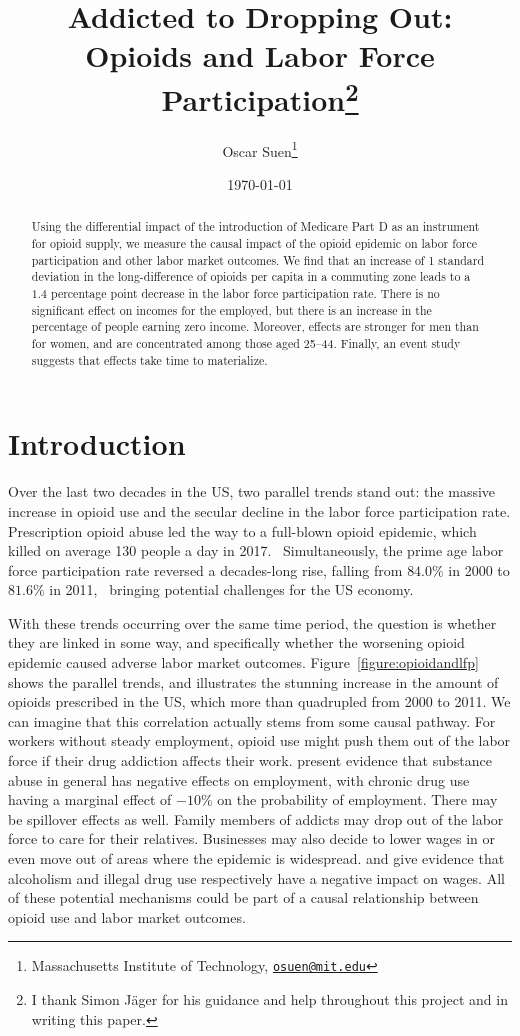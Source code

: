 \documentclass[12pt]{article}
\title{Addicted to Dropping Out: \\ Opioids and Labor Force Participation\thanks{I thank Simon J\"ager for his guidance and help throughout this project and in writing this paper.}}
\author{Oscar Suen\thanks{Massachusetts Institute of Technology, \href{mailto:osuen@mit.edu}{\texttt{osuen@mit.edu}}}}
\date{\today}
\begin{document}
\maketitle

\begin{abstract}
\noindent Using the differential impact of the introduction of Medicare Part D as an instrument for opioid supply, we measure the causal impact of the opioid epidemic on labor force participation and other labor market outcomes.  We find that an increase of 1 standard deviation in the long-difference of opioids per capita in a commuting zone leads to a $1.4$ percentage point decrease in the labor force participation rate.  
There is no significant effect on incomes for the employed, but there is an increase in the percentage of people earning zero income.  Moreover, effects are stronger for men than for women, and are concentrated among those aged 25--44.  Finally, an event study suggests that effects take time to materialize.
\end{abstract}

\newpage
\section{Introduction} \label{introduction}
Over the last two decades in the US, two parallel trends stand out: the massive increase in opioid use and the secular decline in the labor force participation rate.  Prescription opioid abuse led the way to a full-blown opioid epidemic, which killed on average 130 people a day in 2017.~ Simultaneously, the prime age labor force participation rate reversed a decades-long rise, falling from $84.0\%$ in 2000 to $81.6\%$ in 2011,~ bringing potential challenges for the US economy.

With these trends occurring over the same time period, the question is whether they are linked in some way, and specifically whether the worsening opioid epidemic caused adverse labor market outcomes.  Figure~\ref{figure:opioidandlfp} shows the parallel trends, and illustrates the stunning increase in the amount of opioids prescribed in the US, which more than quadrupled from 2000 to 2011.  We can imagine that this correlation actually stems from some causal pathway.  For workers without steady employment, opioid use might push them out of the labor force if their drug addiction affects their work.  \textcite{miamidrugs} present evidence that substance abuse in general has negative effects on employment, with chronic drug use having a marginal effect of $-10\%$ on the probability of employment.  There may be spillover effects as well.  Family members of addicts may drop out of the labor force to care for their relatives.  Businesses may also decide to lower wages in or even move out of areas where the epidemic is widespread.  \textcite{mullahy93} and \textcite{kaestner94} give evidence that alcoholism and illegal drug use respectively have a negative impact on wages.  All of these potential mechanisms could be part of a causal relationship between opioid use and labor market outcomes.  
\end{document}
